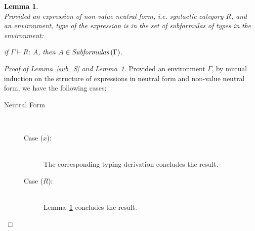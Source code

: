 \documentclass[a4paper]{article}
\newcommand{\typecolor}{}
\newcommand{\termcolor}{}
\newcommand{\tp}[1]{{\typecolor #1}}
\newcommand{\tm}[1]{{\termcolor #1}}
\newtheorem{lemma}[theorem]{Lemma}
\newcommand{\expvar}[1]{#1}
\newcommand{\typing}[2]{\tm{#1:\ }\tp{#2}}
\newcommand{\txt}[1]{\text{\textit{#1}}}
\newcommand{\subformulas}[1]{\txt{Subformulas}\,(#1)}
\begin{document}
\begin{lemma}\ \\
\label{sub_R}
Provided an expression of non-value neutral form, i.e. syntactic
category $R$, and an environment, type of the expression is in the set
of subformulas of types in the environment:
 
 if $\Gamma \vdash \typing{R}{A}$, then $A \in \subformulas{\Gamma}$.
\end{lemma}
 
\begin{proof}[Proof of Lemma~\ref{sub_S} and Lemma~\ref{sub_R}]
Provided an environment $\Gamma$, by mutual induction on the structure
of expressions in neutral form and non-value neutral form, we have the
following cases:

\begin{description}

\item[Neutral Form]\ \\
\begin{description}
\item[Case ($\expvar{x}$):]\ \\ 
  The corresponding typing derivation concludes the result.
\item[Case ($R$):]\ \\
  Lemma~\ref{sub_R} concludes the result.   
\end{description}



\end{description}
\end{proof}
\end{document}
